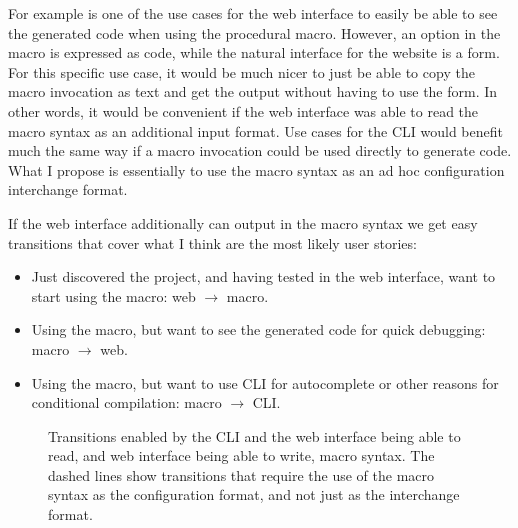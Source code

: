 For example is one of the use cases for the web interface to easily be able to see the generated code when using the procedural macro. However, an option in the macro is expressed as code, while the natural interface for the website is a form. For this specific use case, it would be much nicer to just be able to copy the macro invocation as text and get the output without having to use the form. In other words, it would be convenient if the web interface was able to read the macro syntax as an additional input format. Use cases for the CLI would benefit much the same way if a macro invocation could be used directly to generate code. What I propose is essentially to use the macro syntax as an ad hoc configuration interchange format.

If the web interface additionally can output in the macro syntax we get easy transitions that cover what I think are the most likely user stories:

\begin{itemize}
  \item Just discovered the project, and having tested in the web interface, want to start using the macro: web $\rightarrow$ macro.
  \item Using the macro, but want to see the generated code for quick debugging: macro $\rightarrow$ web.
  \item Using the macro, but want to use CLI for autocomplete or other reasons for conditional compilation: macro $\rightarrow$ CLI.
\end{itemize}

\begin{figure}[ht!]
\vspace{2mm}
\centering
{}
\vspace{2mm}
\caption[Transitions from reading and writing macro syntax]{Transitions enabled by the CLI and the web interface being able to read, and web interface being able to write, macro syntax. The dashed lines show transitions that require the use of the macro syntax as the configuration format, and not just as the interchange format.}
\label{fig:transitions}
\end{figure}

